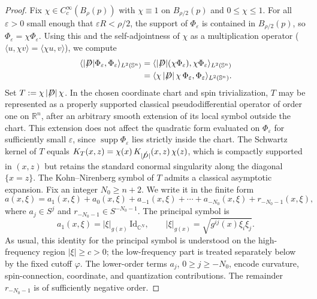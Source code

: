 \documentclass[10pt,a4paper]{amsart}
\def\slashiii#1{\setbox0=\hbox{$#1$}#1\hskip-\wd0\hbox to\wd0{\hss\sl/\/\hss}}
\begin{document}
\begin{proof}
	Fix $\chi \in C_c^\infty(B_\rho(p))$ with $\chi \equiv 1$ on
	$B_{\rho/2}(p)$ and $0 \le \chi \le 1$. For all $\varepsilon > 0$ small
	enough that $\varepsilon R < \rho/2$, the support of $\Phi_\varepsilon$ is
	contained in $B_{\rho/2}(p)$, so $\Phi_\varepsilon = \chi\Phi_\varepsilon$.
	Using this and the self-adjointness of $\chi$ as a multiplication operator
	($\langle u,\chi v\rangle = \langle \chi u, v\rangle$), we compute
	\[
	\begin{aligned}
		\langle |\slashiii{D}|\Phi_\varepsilon,\Phi_\varepsilon\rangle_{L^2(\mathbb{S}^n)}
		&= \langle |\slashiii{D}|(\chi\Phi_\varepsilon),\chi\Phi_\varepsilon
		\rangle_{L^2(\mathbb{S}^n)}\\
		&= \langle \chi\,|\slashiii{D}|\,\chi\,\Phi_\varepsilon,\Phi_\varepsilon
		\rangle_{L^2(\mathbb{S}^n)}.
	\end{aligned}
	\]
	Set $T := \chi\,|\slashiii{D}|\,\chi$. In the chosen coordinate chart and spin
	trivialization, $T$ may be represented as a properly supported classical
	pseudodifferential operator of order one on $\mathbb{R}^n$, after an
	arbitrary smooth extension of its local symbol outside the chart. This
	extension does not affect the quadratic form evaluated on $\Phi_\varepsilon$
	for sufficiently small $\varepsilon$, since $\operatorname{supp}\Phi_\varepsilon$
	lies strictly inside the chart. The Schwartz kernel of $T$ equals
	$K_T(x,z) = \chi(x)\,K_{|\slashiii{D}|}(x,z)\,\chi(z)$, which is compactly supported in
	$(x,z)$ but retains the standard conormal singularity along the diagonal
	$\{x = z\}$. The Kohn--Nirenberg symbol of \(T\) admits a classical asymptotic
	expansion. Fix an integer \(N_0\ge n+2\). We write it in the finite form
	\[
	a(x,\xi)
	=
	a_1(x,\xi)+a_0(x,\xi)+a_{-1}(x,\xi)+\cdots+a_{-N_0}(x,\xi)
	+r_{-N_0-1}(x,\xi),
	\]
	where \(a_j\in S^j\) and \(r_{-N_0-1}\in S^{-N_0-1}\). The principal symbol is
	\[
	a_1(x,\xi)=|\xi|_{g(x)}\,\mathrm{Id}_{\mathbb C^N},
	\qquad
	|\xi|_{g(x)}=\sqrt{g^{ij}(x)\xi_i\xi_j}.
	\]
	As usual, this identity for the principal symbol is understood on the
	high-frequency region \(|\xi|\ge c>0\); the low-frequency part is treated
	separately below by the fixed cutoff \(\varphi\). The lower-order terms \(a_j\), \(0\ge j\ge -N_0\), encode curvature,
	spin-connection, coordinate, and quantization contributions. The remainder
	\(r_{-N_0-1}\) is of sufficiently negative order.
	

\end{proof}
\end{document}
